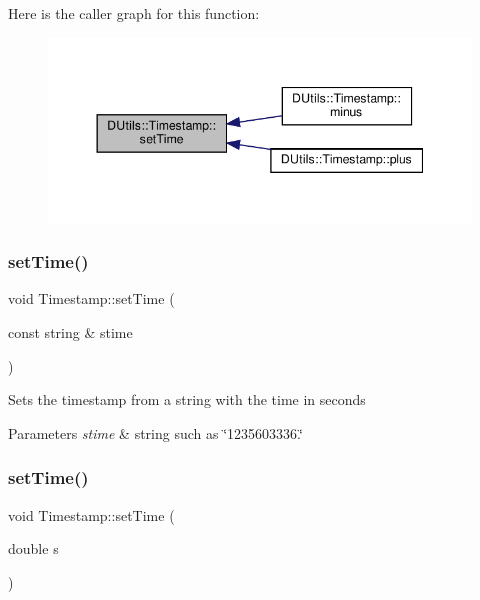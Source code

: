 Here is the caller graph for this function\+:\nopagebreak
\begin{figure}[H]
\begin{center}
\leavevmode
\includegraphics[width=344pt]{classDUtils_1_1Timestamp_a439bcff577f3ae30e8918897ecb33e76_icgraph}
\end{center}
\end{figure}
\mbox{\label{classDUtils_1_1Timestamp_ac35ad9d35e9ce5ff6fea159e9b060bf0}} 
\subsubsection{\texorpdfstring{set\+Time()}{setTime()}\hspace{0.1cm}{\footnotesize\ttfamily [2/3]}}
{\footnotesize\ttfamily void Timestamp\+::set\+Time (\begin{DoxyParamCaption}\item[{const string \&}]{stime }\end{DoxyParamCaption})}

Sets the timestamp from a string with the time in seconds 
\begin{DoxyParams}{Parameters}
{\em stime} & string such as \char`\"{}1235603336.\char`\"{} \\
\hline
\end{DoxyParams}
\mbox{\label{classDUtils_1_1Timestamp_a797856da2823ee26814151ea97aea5e1}} 
\subsubsection{\texorpdfstring{set\+Time()}{setTime()}\hspace{0.1cm}{\footnotesize\ttfamily [3/3]}}
{\footnotesize\ttfamily void Timestamp\+::set\+Time (\begin{DoxyParamCaption}\item[{double}]{s }\end{DoxyParamCaption})}

